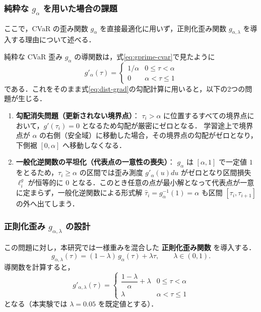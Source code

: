 \documentclass[a4paper,10pt]{jsarticle}
\theoremstyle{definition}
\begin{document}
\subsubsection{純粋な $g_\alpha$ を用いた場合の課題}
ここで，CVaR の歪み関数 $g_\alpha$ を直接最適化に用いず，正則化歪み関数 $g_{\alpha,\lambda}$ を導入する理由について述べる．

純粋な CVaR 歪み $g_\alpha$ の導関数は，式\eqref{eq:gprime-cvar}で見たように
\begin{equation*}
  g'_\alpha(\tau) = \begin{cases} 1/\alpha & 0 \le \tau < \alpha \\ 0 & \alpha < \tau \le 1 \end{cases}
\end{equation*}
である．これをそのまま式\eqref{eq:dist-grad}の勾配計算に用いると，以下の2つの問題が生じる．
\begin{enumerate}
  \item \textbf{勾配消失問題（更新されない境界点）}：
  $\tau_i > \alpha$ に位置するすべての境界点において，$g'(\tau_i) = 0$ となるため勾配が厳密にゼロとなる．
  学習途上で境界点が $\alpha$ の右側（安全域）に移動した場合，その境界点の勾配がゼロとなり，下側裾 $[0, \alpha]$ へ移動しなくなる．
  \item \textbf{一般化逆関数の平坦化（代表点の一意性の喪失）}：
  $g_\alpha$ は $[\alpha, 1]$ で一定値 $1$ をとるため，$\tau_i \ge \alpha$ の区間では歪み測度 $g'_\alpha(u)du$ がゼロとなり区間損失 $\ell_i^g$ が恒等的に $0$ となる．このとき任意の点が最小解となって代表点が一意に定まらず，一般化逆関数による形式解 $\hat\tau_i = g_\alpha^{-1}(1) = \alpha$ も区間 $[\tau_i, \tau_{i+1}]$ の外へ出てしまう．
\end{enumerate}

\subsubsection{正則化歪み $g_{\alpha,\lambda}$ の設計}
この問題に対し，本研究では一様重みを混合した \textbf{正則化歪み関数} を導入する．
\begin{equation}
  g_{\alpha,\lambda}(\tau) = (1-\lambda)\,g_\alpha(\tau) + \lambda\tau,\qquad \lambda \in (0, 1).
  \label{eq:g-reg}
\end{equation}
導関数を計算すると，
\begin{equation}
  g'_{\alpha,\lambda}(\tau) = \begin{cases} \dfrac{1-\lambda}{\alpha} + \lambda & 0 \le \tau < \alpha \\[0.2cm] \lambda & \alpha < \tau \le 1 \end{cases}
  \label{eq:gprime-reg}
\end{equation}
となる（本実験では $\lambda=0.05$ を既定値とする）．
\end{document}

